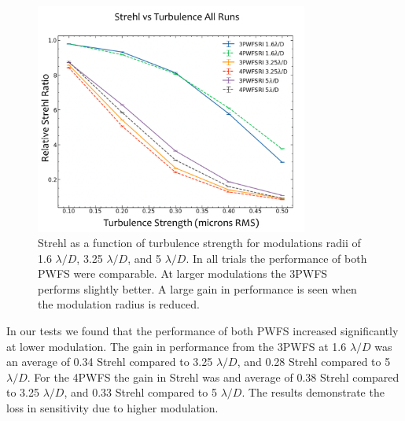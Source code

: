 \begin{figure}
    \centering
    \includegraphics[width=0.8\textwidth]{Chapter Materials/Chapter Five Materials/StrehlvsTurbRI4vs3.png}
    \caption{ Strehl as a function of turbulence strength for modulations radii of 1.6 $\lambda/D$, 3.25 $\lambda/D$, and 5 $\lambda/D$. In all trials the performance of both PWFS were comparable.  At larger modulations the 3PWFS performs slightly better. A large gain in performance is seen when the modulation radius is reduced.}
    \label{fig:results}
\end{figure}

In our tests we found that the performance of both PWFS increased significantly at lower modulation. The gain in performance from the 3PWFS at 1.6 $\lambda/D$ was an average of 0.34 Strehl compared to 3.25 $\lambda/D$, and 0.28 Strehl compared to 5 $\lambda/D$. For the 4PWFS the gain in Strehl was and average of  0.38 Strehl compared to 3.25 $\lambda/D$, and 0.33 Strehl compared to 5 $\lambda/D$. The results demonstrate the loss in sensitivity due to higher modulation. 
